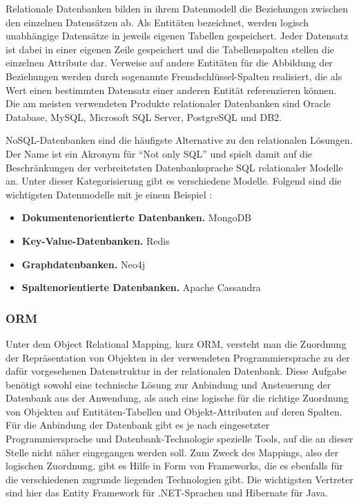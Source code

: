 Relationale Datenbanken bilden in ihrem Datenmodell die Beziehungen zwischen den einzelnen Datensätzen ab.
Als Entitäten bezeichnet, werden logisch unabhängige Datensätze in jeweils eigenen Tabellen gespeichert. Jeder Datensatz ist dabei in einer eigenen Zeile gespeichert und die Tabellenspalten stellen die einzelnen Attribute dar.
Verweise auf andere Entitäten für die Abbildung der Beziehungen werden durch sogenannte Fremdschlüssel-Spalten realisiert, die als Wert einen bestimmten Datensatz einer anderen Entität referenzieren können.
Die am meisten verwendeten Produkte relationaler Datenbanken sind Oracle Database, MySQL, Microsoft SQL Server, PostgreSQL und DB2. \cite{solidIT2017}

\acs{NoSQL}-Datenbanken sind die häufigste Alternative zu den relationalen Lösungen. Der Name ist ein Akronym für \enquote{Not only SQL} und spielt damit auf die Beschränkungen der verbreitetsten Datenbanksprache \acs{SQL} relationaler Modelle an.
Unter dieser Kategorisierung gibt es verschiedene Modelle. Folgend sind die wichtigsten Datenmodelle mit je einem Beispiel \cite{solidIT2017a}:

\begin{itemize}
\item\textbf{Dokumentenorientierte Datenbanken.} MongoDB
\item\textbf{Key-Value-Datenbanken.} Redis
\item\textbf{Graphdatenbanken.} Neo4j
\item\textbf{Spaltenorientierte Datenbanken.} Apache Cassandra
\end{itemize}

\subsubsection{ORM}
Unter dem Object Relational Mapping, kurz \acs{ORM}, versteht man die Zuordnung der Repräsentation von Objekten in der verwendeten Programmiersprache zu der dafür vorgesehenen Datenstruktur in der relationalen Datenbank.
Diese Aufgabe benötigt sowohl eine technische Lösung zur Anbindung und Ansteuerung der Datenbank aus der Anwendung, als auch eine logische für die richtige Zuordnung von Objekten auf Entitäten-Tabellen und Objekt-Attributen auf deren Spalten.
Für die Anbindung der Datenbank gibt es je nach eingesetzter Programmiersprache und Datenbank-Technologie spezielle Tools, auf die an dieser Stelle nicht näher eingegangen werden soll.
Zum Zweck des Mappings, also der logischen Zuordnung, gibt es Hilfe in Form von Frameworks, die es ebenfalls für die verschiedenen zugrunde liegenden Technologien gibt.
Die wichtigsten Vertreter sind hier das Entity Framework für .NET-Sprachen und Hibernate für Java.

